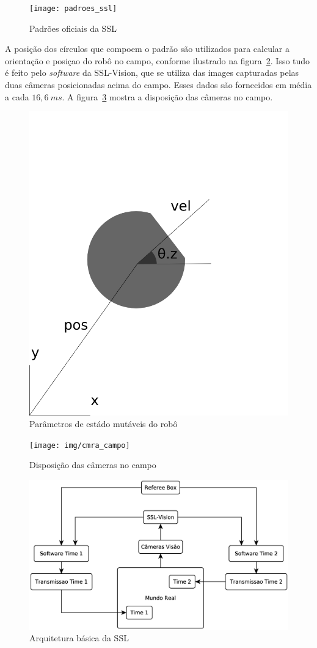 \begin{figure}[thpb]
  \centering
  \texttt{[image: padroes\_ssl]}
  \caption{Padrões oficiais da SSL~\cite{zickler-ssl}}\label{fig:padroes_ssl}
\end{figure}

A posição dos círculos que compoem o padrão são utilizados para calcular a orientação
e posiçao do robô no campo, conforme ilustrado na figura~\ref{fig:rob_data}. Isso
tudo é feito pelo \textit{software} da SSL-Vision, que se utiliza das images capturadas
pelas duas câmeras posicionadas acima do campo. Esses dados são fornecidos em média a
cada $16,6{\ }ms$. A figura~\ref{fig:cmra_campo} mostra a disposição das câmeras no
campo.

\begin{figure}[thpb]
  \centering
  \includegraphics[width=0.5\linewidth]{img/rob_data}
  \caption{Parâmetros de estádo mutáveis do robô}\label{fig:rob_data}
\end{figure}

\begin{figure}[thpb]
  \centering
  \texttt{[image: img/cmra\_campo]}
  \caption{Disposição das câmeras no campo}\label{fig:cmra_campo}
\end{figure}

\begin{figure}[thpb]
  \centering
  \includegraphics[width= 0.8\linewidth]{img/arq_ssl}
  \caption{Arquitetura básica da SSL}\label{fig:arquitetura_ssl}
\end{figure}

